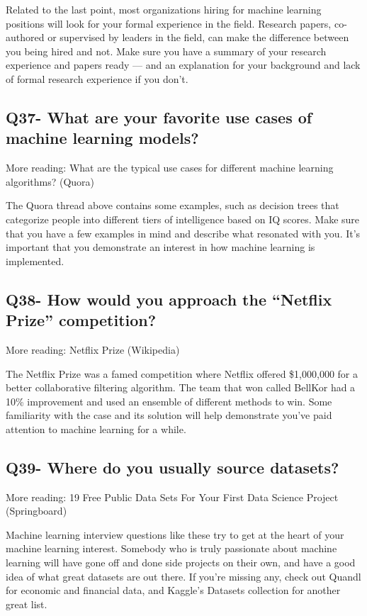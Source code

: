 \documentclass[11pt,a4paper]{article}
\begin{document}
Related to the last point, most organizations hiring for machine learning positions will look for your formal experience in the field. Research papers, co-authored or supervised by leaders in the field, can make the difference between you being hired and not. Make sure you have a summary of your research experience and papers ready — and an explanation for your background and lack of formal research experience if you don’t.

\subsection{Q37- What are your favorite use cases of machine learning models?}

More reading: What are the typical use cases for different machine learning algorithms? (Quora)

The Quora thread above contains some examples, such as decision trees that categorize people into different tiers of intelligence based on IQ scores. Make sure that you have a few examples in mind and describe what resonated with you. It’s important that you demonstrate an interest in how machine learning is implemented.

\subsection{Q38- How would you approach the “Netflix Prize” competition?}

More reading: Netflix Prize (Wikipedia)

The Netflix Prize was a famed competition where Netflix offered \$1,000,000 for a better collaborative filtering algorithm. The team that won called BellKor had a 10\% improvement and used an ensemble of different methods to win. Some familiarity with the case and its solution will help demonstrate you’ve paid attention to machine learning for a while.

\subsection{Q39- Where do you usually source datasets?}

More reading: 19 Free Public Data Sets For Your First Data Science Project (Springboard)

Machine learning interview questions like these try to get at the heart of your machine learning interest. Somebody who is truly passionate about machine learning will have gone off and done side projects on their own, and have a good idea of what great datasets are out there. If you’re missing any, check out Quandl for economic and financial data, and Kaggle’s Datasets collection for another great list.
\end{document}
